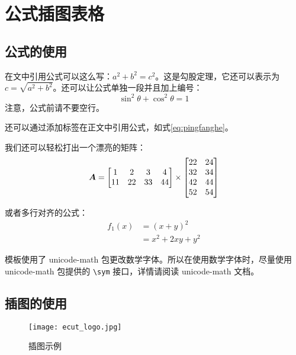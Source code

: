 
\chapter{公式插图表格}
\section{公式的使用}
在文中引用公式可以这么写：\(a^2 + b^2 = c^2\)。这是勾股定理，它还可以表示为 \(c = \sqrt{a^2 + b^2}\)。还可以让公式单独一段并且加上编号：
\begin{equation}
  \sin^2{\theta} + \cos^2{\theta} = 1 \label{eq:pingfanghe}
\end{equation}
注意，公式前请不要空行。

还可以通过添加标签在正文中引用公式，如式\eqref{eq:pingfanghe}。

我们还可以轻松打出一个漂亮的矩阵：
\begin{equation}
  \vb*{A} =
  \begin{bmatrix}
    1  & 2  & 3  & 4  \\
    11 & 22 & 33 & 44 \\
  \end{bmatrix} \times
  \begin{bmatrix}
    22 & 24 \\
    32 & 34 \\
    42 & 44 \\
    52 & 54 \\
  \end{bmatrix}
\end{equation}

或者多行对齐的公式：
\begin{equation}
  \begin{aligned}
    f_1(x) & = (x + y)^2         \\
           & = x^2 + 2 x y + y^2
  \end{aligned}
\end{equation}

模板使用了 unicode-math 包更改数学字体。所以在使用数学字体时，尽量使用 unicode-math 包提供的 \verb|\sym| 接口，详情请阅读 unicode-math 文档。

\section{插图的使用}
\begin{figure}
  \centering
  \texttt{[image: ecut\_logo.jpg]}
  \caption{插图示例}
  \label{fig:whu}
\end{figure}

